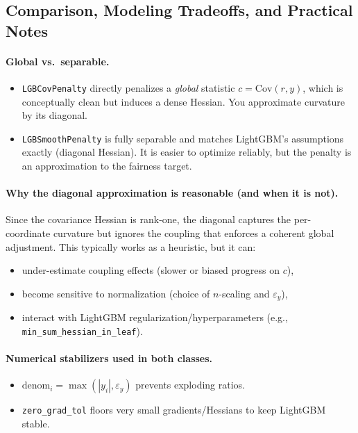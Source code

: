 \documentclass[11pt]{article}
\theoremstyle{plain}
\theoremstyle{definition}
\newcommand{\1}{\mathbf{1}}
\begin{document}
\subsection{Comparison, Modeling Tradeoffs, and Practical Notes}
\label{subsec:comparison_notes}

\paragraph{Global vs.\ separable.}
\begin{itemize}
  \item \texttt{LGBCovPenalty} directly penalizes a \emph{global} statistic $c=\mathrm{Cov}(r,y)$, which is conceptually clean but induces a dense Hessian. You approximate curvature by its diagonal.
  \item \texttt{LGBSmoothPenalty} is fully separable and matches LightGBM's assumptions exactly (diagonal Hessian). It is easier to optimize reliably, but the penalty is an approximation to the fairness target.
\end{itemize}

\paragraph{Why the diagonal approximation is reasonable (and when it is not).}
Since the covariance Hessian is rank-one, the diagonal captures the per-coordinate curvature but ignores the coupling that enforces a coherent global adjustment. This typically works as a heuristic, but it can:
\begin{itemize}
  \item under-estimate coupling effects (slower or biased progress on $c$),
  \item become sensitive to normalization (choice of $n$-scaling and $\varepsilon_y$),
  \item interact with LightGBM regularization/hyperparameters (e.g., \texttt{min\_sum\_hessian\_in\_leaf}).
\end{itemize}

\paragraph{Numerical stabilizers used in both classes.}
\begin{itemize}
  \item $\mathrm{denom}_i=\max(|y_i|,\varepsilon_y)$ prevents exploding ratios.
  \item \texttt{zero\_grad\_tol} floors very small gradients/Hessians to keep LightGBM stable.
\end{itemize}
\end{document}
